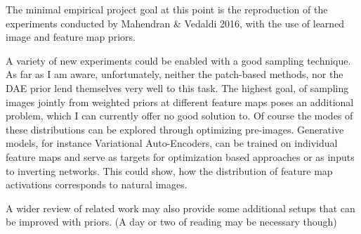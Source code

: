 \documentclass{article}
\begin{document}
The minimal empirical project goal at this point is the reproduction of the experiments conducted by Mahendran \& Vedaldi 2016, with the use of learned image and feature map priors.

A variety of new experiments could be enabled with a good sampling technique. As far as I am aware, unfortunately, neither the patch-based methods, nor the DAE prior lend themselves very well to this task. The highest goal, of sampling images jointly from weighted priors at different feature maps poses an additional problem, which I can currently offer no good solution to. Of course the modes of these distributions can be explored through optimizing pre-images. 
Generative models, for instance Variational Auto-Encoders, can be trained on individual feature maps and serve as targets for optimization based approaches or as inputs to inverting networks. This could show, how the distribution of feature map activations corresponds to natural images.

A wider review of related work may also provide some additional setups that can be improved with priors. (A day or two of reading may be necessary though)
\end{document}
